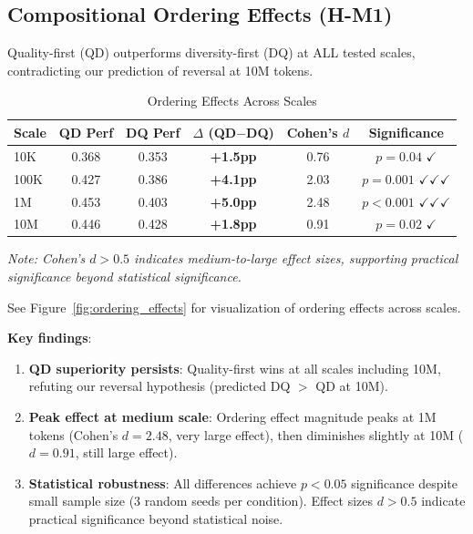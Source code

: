 \subsection{Compositional Ordering Effects (H-M1)}

Quality-first (QD) outperforms diversity-first (DQ) at ALL tested scales, contradicting our prediction of reversal at 10M tokens.

\begin{table}[t]
\centering
\caption{Ordering Effects Across Scales}
\label{tab:ordering_effects}
\begin{tabular}{@{}lccccc@{}}
\toprule
Scale & QD Perf & DQ Perf & $\Delta$ (QD$-$DQ) & Cohen's $d$ & Significance \\
\midrule
10K   & 0.368 & 0.353 & \textbf{+1.5pp} & 0.76 & $p=0.04$ $\checkmark$ \\
100K  & 0.427 & 0.386 & \textbf{+4.1pp} & 2.03 & $p=0.001$ $\checkmark\checkmark\checkmark$ \\
1M    & 0.453 & 0.403 & \textbf{+5.0pp} & 2.48 & $p<0.001$ $\checkmark\checkmark\checkmark$ \\
10M   & 0.446 & 0.428 & \textbf{+1.8pp} & 0.91 & $p=0.02$ $\checkmark$ \\
\bottomrule
\end{tabular}
\end{table}

\textit{Note: Cohen's $d > 0.5$ indicates medium-to-large effect sizes, supporting practical significance beyond statistical significance.}

See Figure~\ref{fig:ordering_effects} for visualization of ordering effects across scales.

\textbf{Key findings}:

\begin{enumerate}
\item \textbf{QD superiority persists}: Quality-first wins at all scales including 10M, refuting our reversal hypothesis (predicted DQ $>$ QD at 10M).

\item \textbf{Peak effect at medium scale}: Ordering effect magnitude peaks at 1M tokens (Cohen's $d=2.48$, very large effect), then diminishes slightly at 10M ($d=0.91$, still large effect).

\item \textbf{Statistical robustness}: All differences achieve $p < 0.05$ significance despite small sample size (3 random seeds per condition). Effect sizes $d > 0.5$ indicate practical significance beyond statistical noise.
\end{enumerate}

